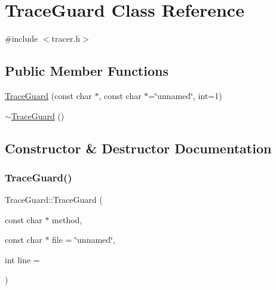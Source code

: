 \hypertarget{class_trace_guard}{}\section{Trace\+Guard Class Reference}
\label{class_trace_guard}


{\ttfamily \#include $<$tracer.\+h$>$}

\subsection*{Public Member Functions}
\begin{DoxyCompactItemize}
\item 
\hyperlink{class_trace_guard_ae189b8822172d8bd263860e3d56fad0e}{Trace\+Guard} (const char $\ast$, const char $\ast$=\char`\"{}unnamed\char`\"{}, int=1)
\item 
\hyperlink{class_trace_guard_ade02f16dafa92b8835808f1403c730ca}{$\sim$\+Trace\+Guard} ()
\end{DoxyCompactItemize}


\subsection{Constructor \& Destructor Documentation}
\mbox{\label{class_trace_guard_ae189b8822172d8bd263860e3d56fad0e}} 
\subsubsection{\texorpdfstring{Trace\+Guard()}{TraceGuard()}}
{\footnotesize\ttfamily Trace\+Guard\+::\+Trace\+Guard (\begin{DoxyParamCaption}\item[{const char $\ast$}]{method,  }\item[{const char $\ast$}]{file = {\ttfamily \char`\"{}unnamed\char`\"{}},  }\item[{int}]{line = {} }\end{DoxyParamCaption})}

\mbox{\label{class_trace_guard_ade02f16dafa92b8835808f1403c730ca}} 

